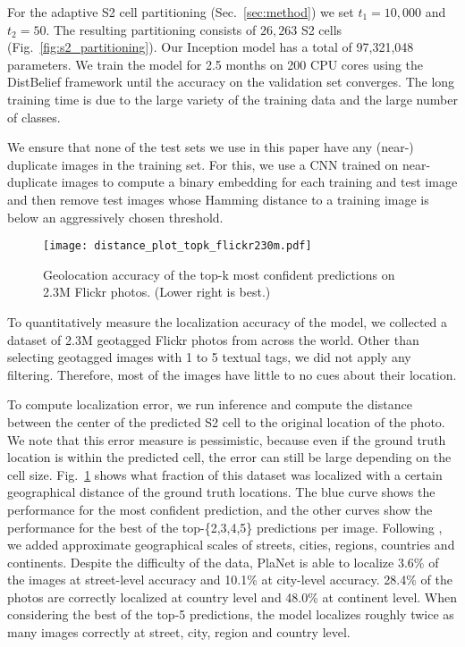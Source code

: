 \documentclass[10pt,twocolumn,letterpaper]{article}
\begin{document}
For the adaptive S2 cell partitioning (Sec.~\ref{sec:method}) we set $t_1=10,000$
and $t_2=50$. The
resulting partitioning consists of $26,263$ S2 cells
(Fig.~\ref{fig:s2_partitioning}). Our Inception model has a total of
97,321,048 parameters.
We train the model for 2.5 months on 200 CPU cores using the DistBelief framework \cite{Dean12NIPS} until the accuracy on the validation set converges. The long training time
is due to the large variety of the training data and the large
number of classes.

We ensure that none of the test sets we use in this paper have any (near-) duplicate images in the training set. For this, we use a CNN trained on near-duplicate images to compute a binary embedding for each training and test image and then remove test images whose Hamming distance to a training image is below an aggressively chosen threshold. 

\begin{figure}[t]
  \centering
 \texttt{[image: distance\_plot\_topk\_flickr230m.pdf]}
 \caption{Geolocation accuracy of the top-k most confident predictions on 2.3M Flickr photos. (Lower right is best.)}
  \label{fig:flickr230m_plot}
\end{figure}
To quantitatively measure the localization accuracy of the model, we collected a dataset of 2.3M geotagged Flickr photos from across the world. Other than selecting geotagged images with 1 to 5 textual tags, we did not apply any filtering. Therefore, most of the images have little to no cues about their location.

To compute localization error, we run inference and compute the distance between the center of the predicted S2 cell to the original location of the photo. We note that this error measure is pessimistic, because even if the ground truth location is within the predicted cell, the error can still be large depending on the cell size.
Fig.~\ref{fig:flickr230m_plot} shows what fraction of this dataset was localized with a certain geographical distance of the ground truth locations. The blue curve shows the performance for the most confident prediction, and the other curves show the performance for the best of the top-\{2,3,4,5\} predictions per image. Following \cite{Hays14MLEVI}, we added approximate geographical scales of streets, cities, regions, countries and continents.
Despite the difficulty of the data, PlaNet is able to localize 3.6\% of the images at street-level accuracy and 10.1\% at city-level accuracy. 28.4\% of the photos are correctly localized at country level and 48.0\% at continent level. When considering the best of the top-5 predictions, the model localizes roughly twice as many images correctly at street, city, region and country level.  
\end{document}
